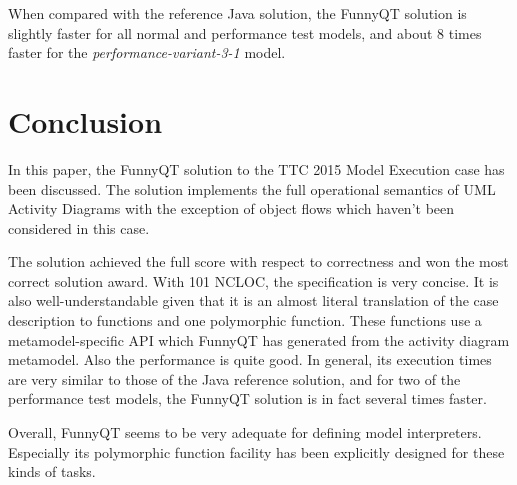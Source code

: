\documentclass[submission]{eptcs}
\begin{document}
When compared with the reference Java solution, the FunnyQT solution is
slightly faster for all normal and performance test models, and about 8 times
faster for the \emph{performance-variant-3-1} model.


\section{Conclusion}
\label{sec:conclusion}

In this paper, the FunnyQT solution to the TTC 2015 Model Execution case has
been discussed.  The solution implements the full operational semantics of UML
Activity Diagrams with the exception of object flows which haven't been
considered in this case.

The solution achieved the full score with respect to correctness and won the
most correct solution award.  With 101 NCLOC, the specification is very
concise.  It is also well-understandable given that it is an almost literal
translation of the case description to functions and one polymorphic function.
These functions use a metamodel-specific API which FunnyQT has generated from
the activity diagram metamodel.  Also the performance is quite good.  In
general, its execution times are very similar to those of the Java reference
solution, and for two of the performance test models, the FunnyQT solution is
in fact several times faster.

Overall, FunnyQT seems to be very adequate for defining model interpreters.
Especially its polymorphic function facility has been explicitly designed for
these kinds of tasks.



\end{document}
